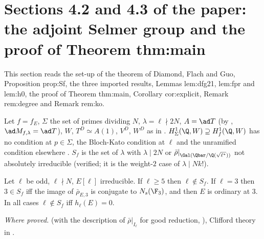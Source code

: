 \begin{sloppypar}
\section[Paper 4.2, 4.3: Theorem thm:main]{Sections 4.2 and 4.3 of the paper: the adjoint Selmer group and the proof of Theorem thm:main}\label{sec:paper:selmer}

This section reads the set-up of the theorem of Diamond, Flach and Guo, Proposition prop:Sf, the three imported results, Lemmas lem:dfg21, lem:fpr and
lem:h0, the proof of Theorem thm:main, Corollary cor:explicit, Remark rem:degree and Remark rem:ko.

\begin{definition}\label{def:paper:selmer-setup}
Let $f=f_E$, $\Sigma$ the set of primes dividing $N$, $\lambda=\ell\nmid2N$, $A=\ad T$ (by , $\ad M_{f,\lambda}=\ad T$), $W$, $T^D\simeq A(1)$, $V^D$, $W^D$ as in
. $H^1_\Sigma(\Q,W)\supseteq H^1_f(\Q,W)$ has no condition at $p\in\Sigma$, the Bloch-Kato condition at $\ell$ and the unramified condition elsewhere \cite[Section 2.1]{DFG04}.
$S_f$ is the set of $\lambda$ with $\lambda\mid2N$ or $\bar\rho|_{\Gal(\Qbar/\Q(\sqrt{\ell^*}))}$ not absolutely irreducible \cite[(31)]{DFG04} (verified; it is the weight-$2$ case of $\lambda\mid Nk!$).
\end{definition}

\begin{proposition}\label{prop:paper:Sf}
Let $\ell$ be odd, $\ell\nmid N$, $E[\ell]$ irreducible. If $\ell\ge5$ then $\ell\notin S_f$. If $\ell=3$ then $3\in S_f$ iff the image of $\bar\rho_{E,3}$ is conjugate to $N_s(\F_3)$, and then $E$ is
ordinary at $3$. In all cases $\ell\notin S_f$ iff $h_\ell(E)=0$.
\end{proposition}

\noindent\emph{Where proved.}  (with the description of $\bar\rho|_{I_\ell}$ for good reduction, \cite[Section 1]{Serre72}), Clifford theory in .


\end{sloppypar}
